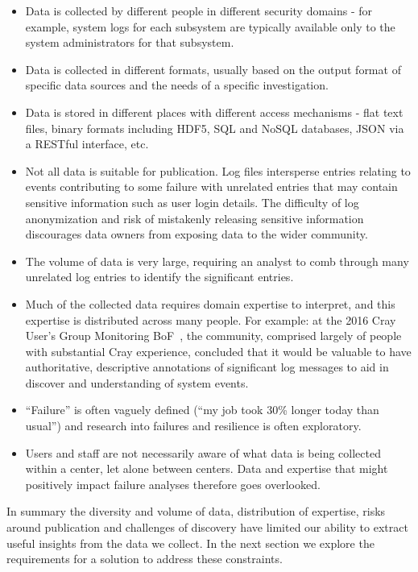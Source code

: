 \begin{itemize}
\item Data is collected by different people in different security domains - for
      example, system logs for each subsystem are typically available only to 
      the system administrators for that subsystem. 
\item Data is collected in different formats, usually based on the output format
      of specific data sources and the needs of a specific investigation.
\item Data is stored in different places with different access mechanisms - flat 
      text files, binary formats including HDF5, SQL and 
      NoSQL databases, JSON via a RESTful interface, etc.
\item Not all data is suitable for publication. Log files intersperse entries
      relating to events contributing to some failure with unrelated entries
      that may contain sensitive information such as user login details. The 
      difficulty of log anonymization and risk of mistakenly releasing sensitive 
      information discourages data owners from exposing data to the wider 
      community.
\item The volume of data is very large, requiring an analyst to comb through 
      many unrelated log entries to identify the significant entries.
\item Much of the collected data requires domain expertise to interpret, and 
      this expertise is distributed across many people. For example: at the 
      2016 Cray User's Group Monitoring BoF~\cite{CUG2016BoF}, the community, 
      comprised largely of people with substantial Cray experience, concluded 
      that it would be valuable to have authoritative, descriptive annotations 
      of significant log messages to aid in discover and understanding of system 
      events.
\item ``Failure'' is often vaguely defined (``my job took 30\% longer today than 
      usual'') and research into failures and resilience is often exploratory.
\item Users and staff are not necessarily aware of what data is being collected
      within a center, let alone between centers. Data and expertise that might 
      positively impact failure analyses therefore goes overlooked.
\end{itemize}

In summary the diversity and volume of data, distribution of expertise, risks 
around publication and challenges of discovery have limited our ability to 
extract useful insights from the data we collect. In the next section we explore 
the requirements for a solution to address these constraints.












